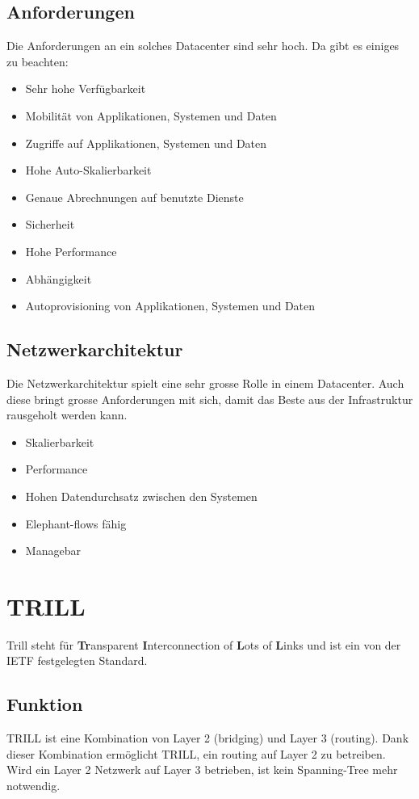 \documentclass[a4,12pt]{scrartcl}
\begin{document}
\subsection{Anforderungen}
Die Anforderungen an ein solches Datacenter sind sehr hoch. Da gibt es einiges zu beachten: 
\begin{itemize}
\item Sehr hohe Verfügbarkeit 
\item Mobilität von Applikationen, Systemen und Daten
\item Zugriffe auf Applikationen, Systemen und Daten 
\item Hohe Auto-Skalierbarkeit 
\item Genaue Abrechnungen auf benutzte Dienste 
\item Sicherheit 
\item Hohe Performance 
\item Abhängigkeit 
\item Autoprovisioning von Applikationen, Systemen und Daten
\end{itemize}

\subsection{Netzwerkarchitektur}
Die Netzwerkarchitektur spielt eine sehr grosse Rolle in einem Datacenter. Auch diese bringt grosse Anforderungen mit sich, damit das Beste aus der Infrastruktur rausgeholt werden kann. 
\begin{itemize}
\item Skalierbarkeit
\item Performance 
\item Hohen Datendurchsatz zwischen den Systemen
\item Elephant-flows fähig 
\item Managebar 
\end{itemize}

\section{TRILL}
Trill steht für \textbf{Tr}ansparent \textbf{I}nterconnection of \textbf{L}ots of \textbf{L}inks und ist ein von der IETF festgelegten Standard.

\subsection{Funktion}
TRILL ist eine Kombination von Layer 2 (bridging) und Layer 3 (routing). Dank dieser Kombination ermöglicht TRILL, ein routing auf Layer 2 zu betreiben. Wird ein Layer 2 Netzwerk auf Layer 3 betrieben, ist kein Spanning-Tree mehr notwendig.
\end{document}
